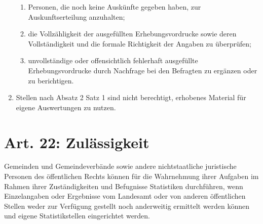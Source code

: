 \begin{enumerate}[label=(\arabic*)]
\begin{enumerate}[label=\arabic*.]
                    \item Personen, die noch keine Auskünfte gegeben haben, zur Auskunftserteilung anzuhalten;
                    \item die Vollzähligkeit der ausgefüllten Erhebungsvordrucke sowie deren Voll\-stän\-dig\-keit und die formale Richtigkeit der Angaben zu überprüfen;
                    \item unvollständige oder offensichtlich fehlerhaft ausgefüllte Erhebungsvordrucke durch Nachfrage bei den Befragten zu ergänzen oder zu berichtigen.
                \end{enumerate}
            \item Stellen nach Absatz 2 Satz 1 sind nicht berechtigt, erhobenes Material für eigene Auswertungen zu nutzen.
        \end{enumerate}

    \section{Art. 22: Zulässigkeit}
        Gemeinden und Gemeindeverbände sowie andere nichtstaatliche juristische Personen des öffentlichen Rechts können für die Wahrnehmung ihrer Aufgaben im Rahmen ihrer Zuständigkeiten und Befugnisse Statistiken durchführen, wenn Einzelangaben oder Ergebnisse vom Landesamt oder von anderen öffentlichen Stellen weder zur Verfügung gestellt noch anderweitig ermittelt werden können und eigene Statistikstellen eingerichtet werden.

